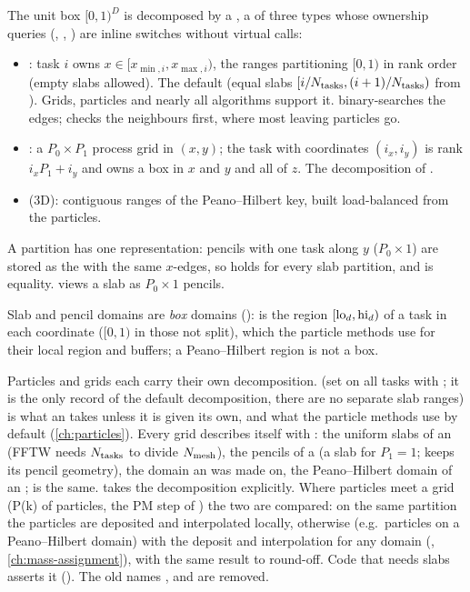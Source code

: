 The unit box $[0,1)^D$ is decomposed by a , a  of three types whose ownership queries
(, , ) are inline switches without virtual calls:
\begin{itemize}
\item {}: task $i$ owns $x\in[x_{\min,i},x_{\max,i})$, the ranges partitioning $[0,1)$ in rank order (empty
      slabs allowed). The default (equal slabs $[i/N_{\rm tasks},(i+1)/N_{\rm tasks})$ from ). Grids, particles and nearly all algorithms support it.
       binary-searches the edges;  checks the neighbours first, where most leaving particles go.
\item {}: a $P_0\times P_1$ process grid in $(x,y)$; the task with coordinates $(i_x,i_y)$ is rank
      $i_xP_1+i_y$ and owns a box in $x$ and $y$ and all of $z$. The decomposition of .
\item {} (3D): contiguous ranges of the Peano--Hilbert key, built load-balanced from the particles.
\end{itemize}
A partition has one representation: pencils with one task along $y$ ($P_0\times1$) are stored as the 
with the same $x$-edges, so  holds for every slab partition, and  is
equality.  views a slab as $P_0\times1$ pencils.

Slab and pencil domains are \emph{box} domains ():  is the region $[{\rm lo}_d,{\rm hi}_d)$
of a task in each coordinate ($[0,1)$ in those not split), which the particle methods use for their local region and
buffers; a Peano--Hilbert region is not a box.

Particles and grids each carry their own decomposition.  (set on all tasks with
; it is the only record of the default decomposition, there are no separate
slab ranges) is what an  takes unless it is given its own, and what
the particle methods use by default (\cref{ch:particles}). Every grid describes itself with : the
uniform slabs of an  (FFTW needs $N_{\rm tasks}$ to divide $N_{\rm mesh}$), the pencils of a 
(a slab for $P_1=1$;  keeps its pencil geometry), the domain an  was made on, the
Peano--Hilbert domain of an ;  is the same.  takes the
decomposition explicitly. Where particles meet a grid (P(k) of particles, the PM step of ) the
two are compared: on the same partition the particles are deposited and interpolated locally, otherwise (e.g.\ particles on
a Peano--Hilbert domain) with the deposit and interpolation for any domain (,
\cref{ch:mass-assignment}), with the same result to round-off. Code that needs slabs asserts it ().
The old names ,  and  are removed.

